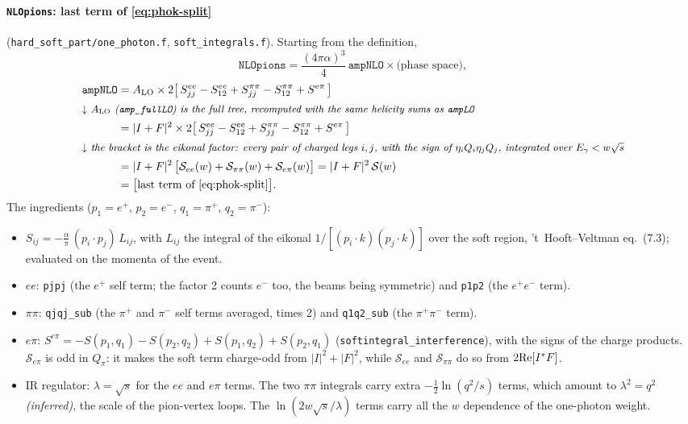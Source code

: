 \documentclass[11pt,a4paper]{article}
\newcommand{\code}[1]{\texttt{#1}}
\begin{document}
\paragraph{\code{NLOpions}: last term of \cref{eq:phok-split}} (\code{hard\_soft\_part/one\_photon.f},
\code{soft\_integrals.f}). Starting from the definition,
\[
  \code{NLOpions}=\frac{(4\pi\alpha)^3}{4}\,\code{ampNLO}\times\text{(phase space)},
\]
\begin{align*}
\code{ampNLO}
&= A_{\rm LO}\times 2\big[\,S_{jj}^{ee}-S_{12}^{ee}+S_{jj}^{\pi\pi}-S_{12}^{\pi\pi}+S^{e\pi}\,\big]\\
\intertext{\small\emph{$\downarrow$ $A_{\rm LO}$ (\code{amp\_fullLO}) is the full tree, recomputed
  with the same helicity sums as \code{ampLO}}}
&= |I+F|^2\times 2\big[\,S_{jj}^{ee}-S_{12}^{ee}+S_{jj}^{\pi\pi}-S_{12}^{\pi\pi}+S^{e\pi}\,\big]\\
\intertext{\small\emph{$\downarrow$ the bracket is the eikonal factor: every pair of charged legs
  $i,j$, with the sign of $\eta_iQ_i\eta_jQ_j$, integrated over $E_\gamma<w\sqrt s$}}
&= |I+F|^2\,\big[\mathcal S_{ee}(w)+\mathcal S_{\pi\pi}(w)+\mathcal S_{e\pi}(w)\big]
 = |I+F|^2\,\mathcal S(w)\\
&= \big[\text{last term of \cref{eq:phok-split}}\big].
\end{align*}
The ingredients ($p_1=e^+$, $p_2=e^-$, $q_1=\pi^+$, $q_2=\pi^-$):
\begin{itemize}
\item $S_{ij}=-\frac{\alpha}{\pi}\,(p_i\cdot p_j)\,L_{ij}$, with $L_{ij}$ the integral of the eikonal
  $1/[(p_i\cdot k)(p_j\cdot k)]$ over the soft region, 't~Hooft--Veltman eq.~(7.3); evaluated on the
  momenta of the event.
\item $ee$: \code{pjpj} (the $e^+$ self term; the factor 2 counts $e^-$ too, the beams being
  symmetric) and \code{p1p2} (the $e^+e^-$ term).
\item $\pi\pi$: \code{qjqj\_sub} (the $\pi^+$ and $\pi^-$ self terms averaged, times 2) and
  \code{q1q2\_sub} (the $\pi^+\pi^-$ term).
\item $e\pi$: $S^{e\pi}=-S(p_1,q_1)-S(p_2,q_2)+S(p_1,q_2)+S(p_2,q_1)$
  (\code{softintegral\_interference}), with the signs of the charge products. $\mathcal S_{e\pi}$
  is odd in $Q_\pi$: it makes the soft term charge-odd from $|I|^2+|F|^2$, while
  $\mathcal S_{ee}$ and $\mathcal S_{\pi\pi}$ do so from $2{\rm Re}[I^*F]$.
\item IR regulator: $\lambda=\sqrt s$ for the $ee$ and $e\pi$ terms. The two $\pi\pi$ integrals carry
  extra $-\frac12\ln(q^2/s)$ terms, which amount to $\lambda^2=q^2$ \emph{(inferred)}, the scale of
  the pion-vertex loops. The $\ln(2w\sqrt s/\lambda)$ terms carry all the $w$ dependence of the
  one-photon weight.
\end{itemize}
\end{document}
